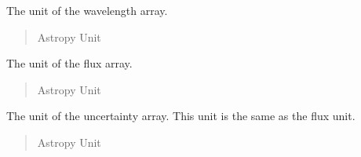 \documentclass[letterpaper,11pt,english]{sphinxmanual}
\begin{document}
\begin{savenotes}
\begin{fulllineitems}

\begin{savenotes}\begin{fulllineitems}
\label{\detokenize{code/lezargus.container.image:lezargus.container.image.LezargusImage.wavelength_unit}}
\pysigstartsignatures
{}
\pysigstopsignatures
\sphinxAtStartPar
The unit of the wavelength array.
\begin{quote}\begin{description}
\sphinxAtStartPar
Astropy Unit

\end{description}\end{quote}

\end{fulllineitems}\end{savenotes}


\begin{savenotes}\begin{fulllineitems}
\label{\detokenize{code/lezargus.container.image:lezargus.container.image.LezargusImage.flux_unit}}
\pysigstartsignatures
{}
\pysigstopsignatures
\sphinxAtStartPar
The unit of the flux array.
\begin{quote}\begin{description}
\sphinxAtStartPar
Astropy Unit

\end{description}\end{quote}

\end{fulllineitems}\end{savenotes}


\begin{savenotes}\begin{fulllineitems}
\label{\detokenize{code/lezargus.container.image:lezargus.container.image.LezargusImage.uncertainty_unit}}
\pysigstartsignatures
{}
\pysigstopsignatures
\sphinxAtStartPar
The unit of the uncertainty array. This unit is the same as the flux
unit.
\begin{quote}\begin{description}
\sphinxAtStartPar
Astropy Unit


\end{description}
\end{quote}
\end{fulllineitems}
\end{savenotes}
\end{fulllineitems}
\end{savenotes}
\end{document}
